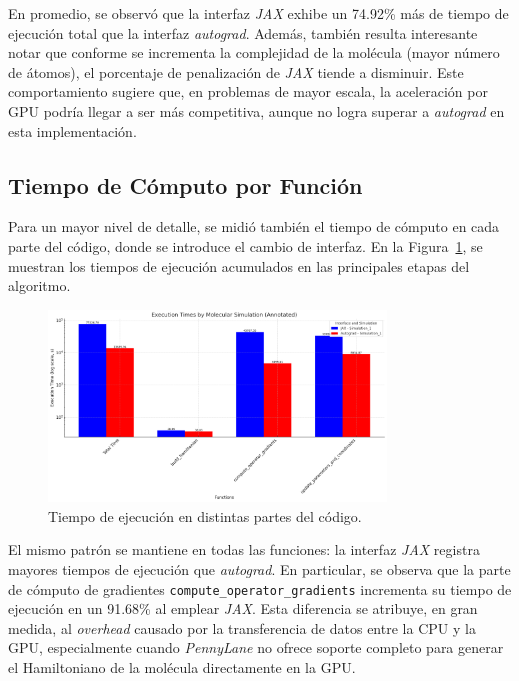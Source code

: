 En promedio, se observó que la interfaz \textit{JAX} exhibe un 74.92\% más de tiempo de ejecución total que la interfaz \textit{autograd}. Además, también resulta interesante notar que conforme se incrementa la complejidad de la molécula (mayor número de átomos), el porcentaje de penalización de \textit{JAX} tiende a disminuir. Este comportamiento sugiere que, en problemas de mayor escala, la aceleración por GPU podría llegar a ser más competitiva, aunque no logra superar a \textit{autograd} en esta implementación.

\subsection{Tiempo de Cómputo por Función}
Para un mayor nivel de detalle, se midió también el tiempo de cómputo en cada parte del código, donde se introduce el cambio de interfaz. En la Figura~\ref{fig:time_functions}, se muestran los tiempos de ejecución acumulados en las principales etapas del algoritmo.

\begin{figure}[H]
  \centering
  \includegraphics[width=0.8\textwidth]{img/time_functions.png}
  \caption{Tiempo de ejecución en distintas partes del código.}
  \label{fig:time_functions}
\end{figure}

El mismo patrón se mantiene en todas las funciones: la interfaz \textit{JAX} registra mayores tiempos de ejecución que \textit{autograd}. En particular, se observa que la parte de cómputo de gradientes \texttt{compute\_operator\_gradients} incrementa su tiempo de ejecución en un 91.68\% al emplear \textit{JAX}. Esta diferencia se atribuye, en gran medida, al \textit{overhead} causado por la transferencia de datos entre la CPU y la GPU, especialmente cuando \textit{PennyLane} no ofrece soporte completo para generar el Hamiltoniano de la molécula directamente en la GPU.

